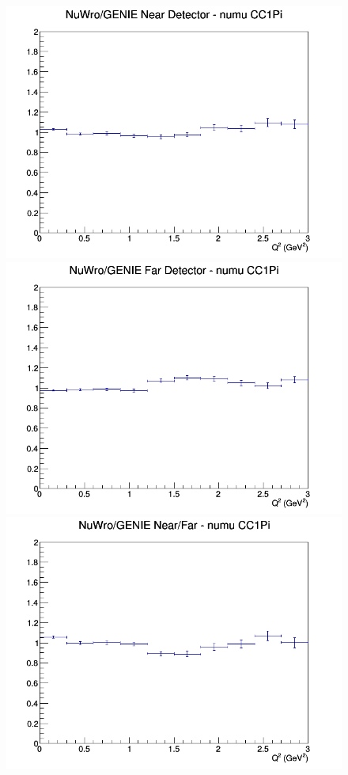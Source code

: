 \begin{figure}[h]
\endminipage
\newline
{}
\includegraphics[width=\linewidth]{eff_Q2/FGT/ratios/CC1Pi_NuWro_GENIE_numu_near_Q2.png}
\endminipage
{}
\includegraphics[width=\linewidth]{eff_Q2/FGT/ratios/CC1Pi_NuWro_GENIE_numu_far_Q2.png}
\endminipage
{}
\includegraphics[width=\linewidth]{eff_Q2/FGT/ratios/CC1Pi_NuWro_GENIE_numu_NF_Q2.png}
\endminipage
\newline
\end{figure}
\clearpage
